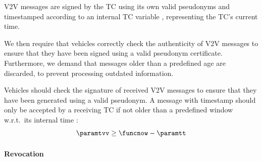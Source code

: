 \begin{req}
    \label{req:v2v-send}
    \ac{V2V} messages are signed by the \ac{TC} using its own valid pseudonyms
   and timestamped according to an internal \ac{TC} variable \funcnow{},
   representing the \ac{TC}'s current time.
\end{req}
We then require that vehicles correctly check the authenticity of \ac{V2V}
messages to ensure that they have been signed using a valid pseudonym
certificate. Furthermore, we demand that messages older than a predefined age
are discarded, to prevent processing outdated information.
%
\begin{req}
    \label{req:v2v-receive}
    Vehicles should check the signature of received \ac{V2V} messages to ensure
    that they have been generated using a valid pseudonym. A message with
    timestamp \paramtvv{} should only be accepted by a receiving \ac{TC} if not
    older than a predefined window \paramtt{} w.r.t.~its internal time
    \funcnow{}:
    \begin{equation}
        \label{eq:valid-v2v-generic}
        \paramtvv \geq \funcnow - \paramtt
    \end{equation}
\end{req}
%

\paragraph{Revocation} 

